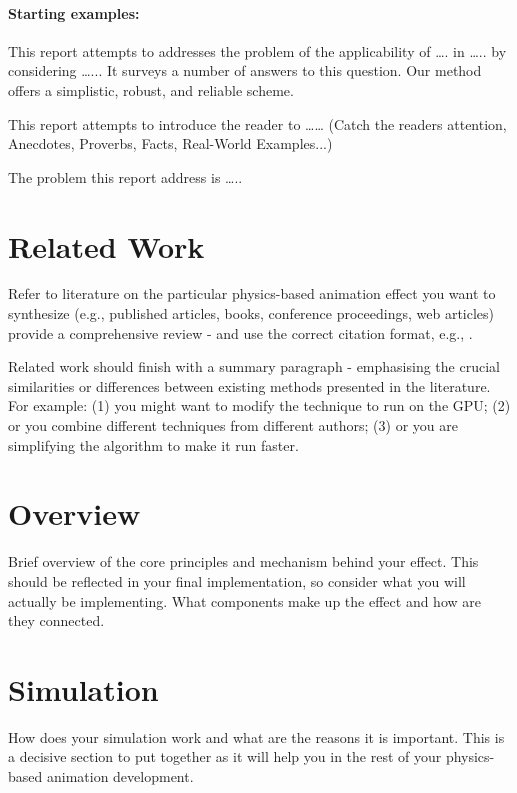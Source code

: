 \documentclass[conference]{acmsiggraph}
\begin{document}
\paragraph{Starting examples:}
This report attempts to addresses the problem of the applicability of …. in ….. by considering …...  It surveys a number of answers to this question.  Our method offers a simplistic, robust, and reliable scheme.

This report attempts to introduce the reader to …… 
(Catch the readers attention, Anecdotes, Proverbs, Facts, Real-World Examples...)

The problem this report address is …..


\section{Related Work}

Refer to literature on the particular physics-based animation effect you want to synthesize (e.g., published articles, books, conference proceedings, web articles) provide a comprehensive review - and use the correct citation format, e.g., \cite{Sako00}.

Related work should finish with a summary paragraph - emphasising the crucial similarities or differences between existing methods presented in the literature.  For example: (1) you might want to modify the technique to run on the GPU; (2) or you combine different techniques from different authors; (3) or you are simplifying the algorithm to make it run faster.

\section{Overview}
Brief overview of the core principles and mechanism behind your effect.  This should be reflected in your final implementation, so consider what you will actually be implementing. What components make up the effect and how are they connected.


\section{Simulation}

How does your simulation work and what are the reasons it is important.  This is a decisive section to put together as it will help you in the rest of your physics-based animation development.
\end{document}
